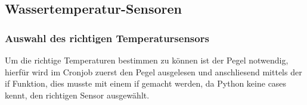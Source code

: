 



\subsection{Wassertemperatur-Sensoren}

\subsubsection{Auswahl des richtigen Temperatursensors}
Um die richtige Temperaturen bestimmen zu können ist der Pegel notwendig, hierfür wird im Cronjob zuerst den Pegel ausgelesen und anschliesend mittels der if Funktion, dies musste mit einem if gemacht werden, da Python keine cases kennt, den richtigen Sensor ausgewählt.




